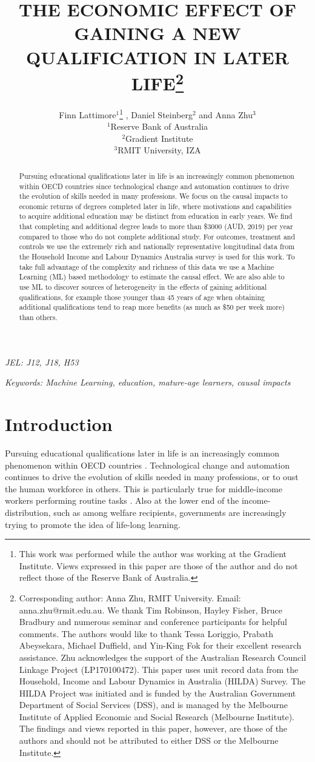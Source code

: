 \documentclass[12pt, a4paper]{article}
\title{THE ECONOMIC EFFECT OF GAINING A NEW QUALIFICATION IN LATER LIFE\thanks{\scriptsize{Corresponding author: Anna Zhu, RMIT University. Email: anna.zhu@rmit.edu.au. \newline \newline We thank Tim Robinson, Hayley Fisher, Bruce Bradbury and numerous seminar and conference participants for helpful comments. The authors would like to thank Tessa Loriggio, Prabath Abeysekara, Michael Duffield, and Yin-King Fok for their excellent research assistance. \newline \newline Zhu acknowledges the support of the Australian Research Council Linkage Project (LP170100472). This paper uses unit record data from the Household, Income and Labour Dynamics in Australia (HILDA) Survey. The HILDA Project was initiated and is funded by the Australian Government Department of Social Services (DSS), and is managed by the Melbourne Institute of Applied Economic and Social Research (Melbourne Institute). The findings and views reported in this paper, however, are those of the authors and should not be attributed to either DSS or the Melbourne Institute.}}} \vspace{0.2cm} \author{Finn Lattimore$^1$\thanks{\scriptsize{This work was performed while the author was working at the Gradient Institute. Views expressed in this paper are those of the author and do not reflect those of the Reserve Bank of Australia.}}\vspace{0.2cm} ,  Daniel Steinberg$^2$ and Anna Zhu$^3$ \\\small {$^1$Reserve Bank of Australia} \vspace{0.2cm} \\ {$^2$Gradient Institute} \vspace{0.2cm} \\ {$^3$RMIT University, IZA}}
\begin{document}

\maketitle


\begin{abstract}

  Pursuing educational qualifications later in life is an increasingly common
  phenomenon within OECD countries since technological change and automation
  continues to drive the evolution of skills needed in many professions. We
  focus on the causal impacts to economic returns of degrees completed later in
  life, where motivations and capabilities to acquire additional education may
  be distinct from education in early years. We find that completing and
  additional degree leads to more than \$3000 (AUD, 2019) per year compared to
  those who do not complete additional study. For outcomes, treatment and
  controls we use the extremely rich and nationally representative longitudinal
  data from the Household Income and Labour Dynamics Australia survey is used
  for this work. To take full advantage of the complexity and richness of this
  data we use a Machine Learning (ML) based methodology to estimate the causal
  effect. We are also able to use ML to discover sources of heterogeneity in
  the effects of gaining additional qualifications, for example those younger
  than 45 years of age when obtaining additional qualifications tend to reap
  more benefits (as much as \$50 per week more) than others.

\end{abstract}


\emph{JEL: J12, J18, H53}

\emph{Keywords: Machine Learning, education, mature-age learners, causal impacts}


\clearpage
\onehalfspacing


\section{Introduction}

Pursuing educational qualifications later in life is an increasingly common
phenomenon within OECD countries \citep{oecd2016}. Technological change and
automation continues to drive the evolution of skills needed in many
professions, or to oust the human workforce in others. This is particularly
true for middle-income workers performing routine tasks
\citep{autor2008,acemoglu2011}. Also at the lower end of the
income-distribution, such as among welfare recipients, governments are
increasingly trying to promote the idea of life-long learning.
\end{document}
